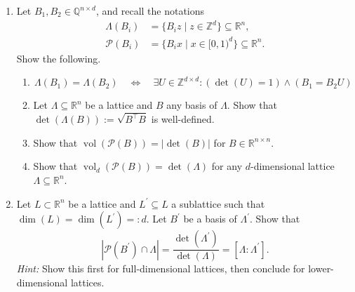 \documentclass[12pt,a4paper]{article}
\def \R {\mathbb R}
\def \Q {\mathbb Q}
\def \Z {\mathbb Z}
\DeclareMathOperator{\vol}{vol}
\begin{document}
\begin{enumerate}
\item Let $B_1, B_2 \in \Q^{n \times d}$, and recall the notations
\begin{align*}
\Lambda(B_i) &= \{ B_i z \mid z \in \Z^d\} \subseteq \R^n, \\
\mathcal{P}(B_i) &= \{B_i x \mid x \in [0,1)^d\} \subseteq \R^n.
\end{align*}
Show the following.
\begin{enumerate}
\item
\[
\Lambda (B_1) = \Lambda (B_2) \quad \Leftrightarrow \quad \exists U \in \Z^{d \times d}: (\det(U) = 1) \wedge (B_1 = B_2 U)
\]
\item Let $\Lambda \subseteq \R^n$ be a lattice and $B$ any basis of $\Lambda$.
Show that $\det (\Lambda(B)) := \sqrt{B^\intercal B}$ is well-defined.
\item Show that $\vol(\mathcal{P}(B)) = | \det (B) |$ for $B \in \R^{n \times n}$.
\item Show that $\vol_d(\mathcal{P}(B)) = \det (\Lambda)$ for any $d$-dimensional lattice $\Lambda \subseteq \R^n$.
\end{enumerate}
\item Let $L \subset \R^n$ be a lattice and $L^\prime \subseteq L$ a sublattice such that $\dim(L) = \dim(L^\prime) =: d$.
Let $B^\prime$ be a basis of $\Lambda^\prime$.
Show that
\[
 | \mathcal{P}(B^\prime) \cap \Lambda | = \frac{\det(\Lambda^\prime)}{\det (\Lambda)} = [\Lambda : \Lambda^\prime].
\]
\textit{Hint:} Show this first for full-dimensional lattices, then conclude for lower-dimensional lattices.
\end{enumerate}
\end{document}
